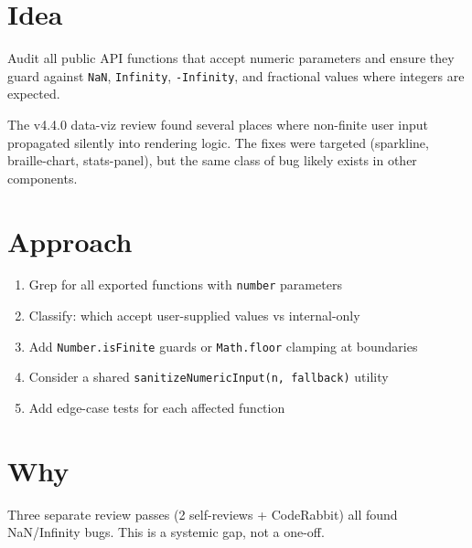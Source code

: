 \section{Idea}\label{record-309-idea}

Audit all public API functions that accept numeric parameters and ensure they guard against \texttt{N\allowbreak{}a\allowbreak{}N}, \texttt{I\allowbreak{}n\allowbreak{}f\allowbreak{}i\allowbreak{}n\allowbreak{}i\allowbreak{}t\allowbreak{}y}, \texttt{-\allowbreak{}I\allowbreak{}n\allowbreak{}f\allowbreak{}i\allowbreak{}n\allowbreak{}i\allowbreak{}t\allowbreak{}y}, and fractional values where integers are expected.

The v4.4.0 data-viz review found several places where non-finite user input propagated silently into rendering logic. The fixes were targeted (sparkline, braille-chart, stats-panel), but the same class of bug likely exists in other components.

\section{Approach}\label{record-309-approach}

\begin{enumerate}
\def\labelenumi{\arabic{enumi}.}
\tightlist
\item
  Grep for all exported functions with \texttt{n\allowbreak{}u\allowbreak{}m\allowbreak{}b\allowbreak{}e\allowbreak{}r} parameters
\item
  Classify: which accept user-supplied values vs internal-only
\item
  Add \texttt{N\allowbreak{}u\allowbreak{}m\allowbreak{}b\allowbreak{}e\allowbreak{}r\allowbreak{}.\allowbreak{}i\allowbreak{}s\allowbreak{}F\allowbreak{}i\allowbreak{}n\allowbreak{}i\allowbreak{}t\allowbreak{}e} guards or \texttt{M\allowbreak{}a\allowbreak{}t\allowbreak{}h\allowbreak{}.\allowbreak{}f\allowbreak{}l\allowbreak{}o\allowbreak{}o\allowbreak{}r} clamping at boundaries
\item
  Consider a shared \texttt{s\allowbreak{}a\allowbreak{}n\allowbreak{}i\allowbreak{}t\allowbreak{}i\allowbreak{}z\allowbreak{}e\allowbreak{}N\allowbreak{}u\allowbreak{}m\allowbreak{}e\allowbreak{}r\allowbreak{}i\allowbreak{}c\allowbreak{}I\allowbreak{}n\allowbreak{}p\allowbreak{}u\allowbreak{}t\allowbreak{}(\allowbreak{}n\allowbreak{},\allowbreak{} \allowbreak{}f\allowbreak{}a\allowbreak{}l\allowbreak{}l\allowbreak{}b\allowbreak{}a\allowbreak{}c\allowbreak{}k\allowbreak{})} utility
\item
  Add edge-case tests for each affected function
\end{enumerate}

\section{Why}\label{record-309-why}

Three separate review passes (2 self-reviews + CodeRabbit) all found NaN/Infinity bugs. This is a systemic gap, not a one-off.

